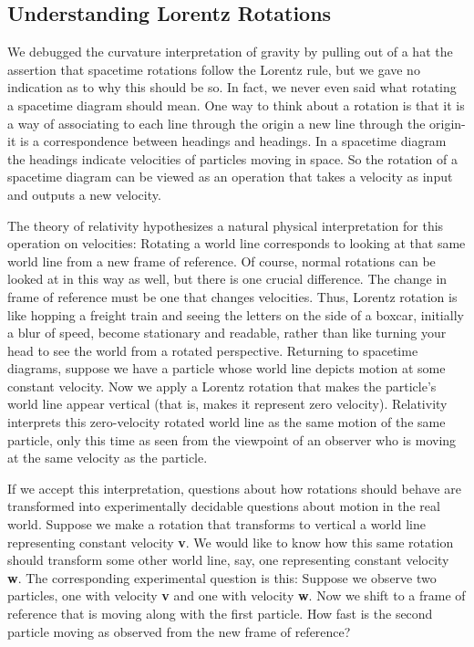 \documentclass{book}
\begin{document}
\subsection{Understanding Lorentz Rotations}

We debugged the curvature interpretation of gravity by pulling out of a
hat the assertion that spacetime rotations follow the Lorentz rule, but
we gave no indication as to why this should be so. In fact, we never even
said what rotating a spacetime diagram should mean. One way to think
about a rotation is that it is a way of associating to each line through
the origin a new line through the origin-it is a correspondence between
headings and headings. In a spacetime diagram the headings indicate
velocities of particles moving in space. So the rotation of a spacetime
diagram can be viewed as an operation that takes a velocity as input
and outputs a new velocity.

The theory of relativity hypothesizes a natural physical interpretation
for this operation on velocities: Rotating a world line corresponds to
looking at that same world line from a new frame of reference. Of
course, normal rotations can be looked at in this way as well, but there
is one crucial difference. The change in frame of reference must be one
that changes velocities. Thus, Lorentz rotation is like hopping a freight
train and seeing the letters on the side of a boxcar, initially a blur of
speed, become stationary and readable, rather than like turning your
head to see the world from a rotated perspective.
Returning to spacetime diagrams, suppose we have a particle whose
world line depicts motion at some constant velocity. Now we apply
a Lorentz rotation that makes the particle's world line appear vertical
(that is, makes it represent zero velocity). Relativity interprets this zero-velocity rotated world line as the same motion of the same particle, only
this time as seen from the viewpoint of an observer who is moving at
the same velocity as the particle.

If we accept this interpretation, questions about how rotations should
behave are transformed into experimentally decidable questions about
motion in the real world. Suppose we make a rotation that transforms
to vertical a world line representing constant velocity \textbf{v}. We would like
to know how this same rotation should transform some other world
line, say, one representing constant velocity \textbf{w}. The corresponding experimental question is this: Suppose we observe two particles, one with
velocity \textbf{v} and one with velocity \textbf{w}. Now we shift to a frame of reference that is moving along with the first particle. How fast is the second
particle moving as observed from the new frame of reference?
\end{document}
